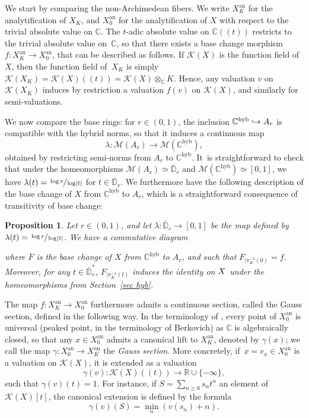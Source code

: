 \documentclass[JEP,XML,SOM,Unicode,published]{cedram}
\newcommand{\NoChangel}[1]{%
\expandafter\let\csname old\string#1\endcsname=#1
\let#1=\relax
\newcommand{#1}{\mathcode`l="716C\csname old\string#1\endcsname\mathcode`l="7160 }%
}
\newcommand\hto{\mathrel{\lhook\joinrel\to}}
\let\ts\textstyle
\newcommand{\lpr}{(\!(}
\newcommand{\rpr}{)\!)}
\newtheorem{prop}[equation]{Proposition}
\theoremstyle{definition}
\newcommand \C{\mathbb C}
\newcommand \D {\mathbb{D}}
\newcommand \R{\mathbb R}
\newcommand \M {\mathscr {M}}
\newcommand{\an}{\mathrm{an}}
\newcommand{\hol}{\mathrm{hol}}\NoChangel{\hol}
\newcommand{\hyb}{\mathrm{hyb}}
\begin{document}
We start by comparing the non-Archimedean fibers. We write $X^{\an}_K$ for the analytification of $X_K$, and $X^{\an}_0$ for the analytification of $X$ with respect to the trivial absolute value on $\C$. The $t$-adic absolute value on $\C\lpr t\rpr$ restricts to the trivial absolute value on~$\C$, so that there exists a base change morphism $f: X^{\an}_K \to X^{\an}_0$, that can be descri\-bed as follows. If $\mathcal{K}(X)$ is the function field of $X$, then the function field of~$X_K$ is simply $\mathcal{K}(X_K) = \mathcal{K}(X)\lpr t\rpr = \mathcal{K}(X) \otimes_{\C} K$. Hence, any valuation $v$ on $\mathcal{K}(X_K)$ induces by restriction a valuation $f(v)$ on $\mathcal{K}(X)$, and similarly for semi-valuations.

We now compare the base rings: for $r \in (0,1)$, the inclusion $\C^{\hyb} \hto A_r$ is compatible with the hybrid norms, so that it induces a continuous map
\[
\lambda: \M(A_r) \to \M(\C^{\hyb}),
\]
obtained by restricting semi-norms from $A_r$ to $\C^{\hyb}$. It~is straightforward to check that under the homeomorphisms $\M(A_r) \simeq \bar{\D}_r$ and $\M(\C^{\hyb}) \simeq [0,1]$, we have $\lambda(t) =\nobreak \sfrac{\log r}{\log \lvert t \rvert}$ for $t \in \bar{\D}_r$. We furthermore have the following description of the base change of $X$ from $\C^{\hyb}$ to $A_r$, which is a straightforward consequence of transitivity of base change:
\begin{prop} \label{prop bc hyb} Let $r \in (0,1)$, and let $\lambda: \bar{\D}_r \to [0,1]$ be the map defined by $\lambda(t) = \sfrac{\log r}{\log \lvert t \rvert}$. We have a commutative diagram
\begin{center}
\end{center}
where $F$ is the base change of $X$ from $\C^{\hyb}$ to $A_r$, and such that $F_{| \pi_K^{-1}(0)} =f$. Moreover, for any $t \in \bar{\D}_r^*$, $F_{| \pi_K^{-1}(t)}$ induces the identity on $X^{\hol}$ under the homeomorphisms from Section~\ref{sec hyb}.
\end{prop}
The map $f: X^{\an}_K \to X^{\an}_0$ furthermore admits a continuous section, called the Gauss section, defined in the following way.
In the terminology of \cite[Def.\,3.2]{Poi}, every point of $X^{\an}_0$ is universal (peaked point, in the terminology of Berkovich) as $\C$ is algebraically closed, so that any $x \in X^{\an}_0$ admits a canonical lift to $X^{\an}_K$, denoted by $\gamma(x)$; we call the map $\gamma: X^{\an}_0 \to X^{\an}_K$ the \emph{Gauss section}. More concretely, if~$x= v_x \in X^{\an}_0$ is a valuation on $\mathcal{K}(X)$, it is extended as a valuation
\[
\gamma(v): \mathcal{K}(X)\lpr t\rpr \to \R \cup \{ - \infty \},
\]
such that $\gamma(v)(t) =1$. For instance, if $S= \sum_{n \ge 0} s_n t^n$ an element of $\mathcal{K}(X)[t]$, the canonical extension is defined by the formula
\[
\gamma(v)(S) = \min_{n} (v(s_n) +n).
\]
\end{document}
